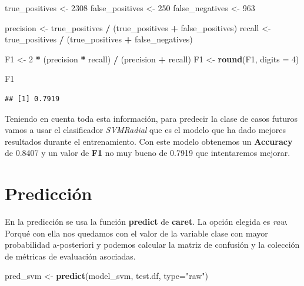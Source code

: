 \documentclass[]{article}
\newenvironment{Shaded}{\begin{snugshade}}{\end{snugshade}}
\newcommand{\DataTypeTok}[1]{\textcolor[rgb]{0.13,0.29,0.53}{#1}}
\newcommand{\DecValTok}[1]{\textcolor[rgb]{0.00,0.00,0.81}{#1}}
\newcommand{\KeywordTok}[1]{\textcolor[rgb]{0.13,0.29,0.53}{\textbf{#1}}}
\newcommand{\NormalTok}[1]{#1}
\newcommand{\OperatorTok}[1]{\textcolor[rgb]{0.81,0.36,0.00}{\textbf{#1}}}
\newcommand{\StringTok}[1]{\textcolor[rgb]{0.31,0.60,0.02}{#1}}
\begin{document}
\begin{Shaded}
\begin{Highlighting}[]
\NormalTok{true_positives <-}\StringTok{ }\DecValTok{2308}
\NormalTok{false_positives <-}\StringTok{ }\DecValTok{250}
\NormalTok{false_negatives <-}\StringTok{ }\DecValTok{963}

\NormalTok{precision <-}\StringTok{ }\NormalTok{true_positives }\OperatorTok{/}\StringTok{ }\NormalTok{(true_positives }\OperatorTok{+}\StringTok{ }\NormalTok{false_positives)}
\NormalTok{recall <-}\StringTok{ }\NormalTok{true_positives }\OperatorTok{/}\StringTok{ }\NormalTok{(true_positives }\OperatorTok{+}\StringTok{ }\NormalTok{false_negatives)}

\NormalTok{F1 <-}\StringTok{ }\DecValTok{2} \OperatorTok{*}\StringTok{ }\NormalTok{(precision }\OperatorTok{*}\StringTok{ }\NormalTok{recall) }\OperatorTok{/}\StringTok{ }\NormalTok{(precision }\OperatorTok{+}\StringTok{ }\NormalTok{recall)}
\NormalTok{F1 <-}\StringTok{ }\KeywordTok{round}\NormalTok{(F1, }\DataTypeTok{digits =} \DecValTok{4}\NormalTok{)}

\NormalTok{F1}
\end{Highlighting}
\end{Shaded}

\begin{verbatim}
## [1] 0.7919
\end{verbatim}

Teniendo en cuenta toda esta información, para predecir la clase de
casos futuros vamos a usar el clasificador \emph{SVMRadial} que es el
modelo que ha dado mejores resultados durante el entrenamiento. Con este
modelo obtenemos un \textbf{Accuracy} de 0.8407 y un valor de
\textbf{F1} no muy bueno de 0.7919 que intentaremos mejorar.

\hypertarget{predicciuxf3n}{%
\section{Predicción}\label{predicciuxf3n}}

En la predicción se usa la función \textbf{predict} de \textbf{caret}.
La opción elegida es \emph{raw}. Porqué con ella nos quedamos con el
valor de la variable clase con mayor probabilidad a-posteriori y podemos
calcular la matriz de confusión y la colección de métricas de evaluación
asociadas.

\begin{Shaded}
\begin{Highlighting}[]
\NormalTok{pred_svm <-}\StringTok{ }\KeywordTok{predict}\NormalTok{(model_svm, test.df, }\DataTypeTok{type=}\StringTok{"raw"}\NormalTok{)}
\end{Highlighting}
\end{Shaded}
\end{document}

